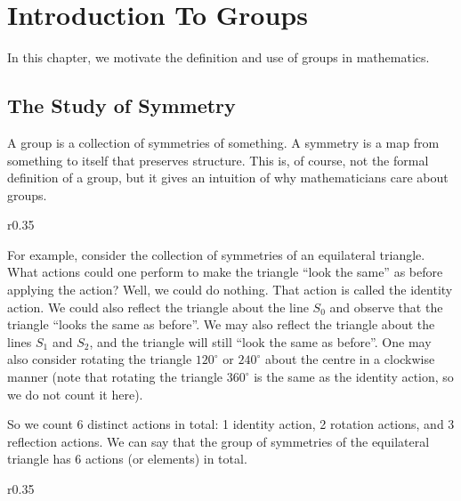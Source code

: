 \chapter{Introduction To Groups}
In this chapter, we motivate the definition and use of groups in mathematics.

\section{The Study of Symmetry}
A group is a collection of symmetries of something. A symmetry is a map from something to itself that preserves structure. This is, of course, not the formal definition of a group, but it gives an intuition of why mathematicians care about groups.

\begin{wrapfigure}{r}{0.35\textwidth}
    \centering
\end{wrapfigure}

For example, consider the collection of symmetries of an equilateral triangle. What actions could one perform to make the triangle ``look the same'' as before applying the action? Well, we could do nothing. That action is called the identity action. We could also reflect the triangle about the line $S_0$ and observe that the triangle ``looks the same as before''. We may also reflect the triangle about the lines $S_1$ and $S_2$, and the triangle will still ``look the same as before''. One may also consider rotating the triangle $120^\circ$ or $240^\circ$ about the centre in a clockwise manner (note that rotating the triangle $360^\circ$ is the same as the identity action, so we do not count it here).

So we count 6 distinct actions in total: 1 identity action, 2 rotation actions, and 3 reflection actions. We can say that the group of symmetries of the equilateral triangle has 6 actions (or elements) in total.

\begin{wrapfigure}{r}{0.35\textwidth}
    \centering
\end{wrapfigure}

